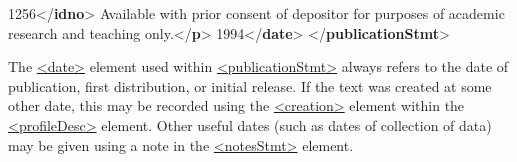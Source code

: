 \begin{shaded}
1256{</\textbf{idno}>}\mbox{}\newline 
{}\mbox{}\newline 
\hspace*{1em}Available with prior consent of depositor for\mbox{}\newline 
\hspace*{1em}\hspace*{1em}\hspace*{1em}\hspace*{1em} purposes of academic research and teaching only.{</\textbf{p}>}\mbox{}\newline 
{}\mbox{}\newline 
{}1994{</\textbf{date}>}\mbox{}\newline 
{</\textbf{publicationStmt}>}\end{shaded}\egroup\par \par
The \hyperref[TEI.date]{<date>} element used within \hyperref[TEI.publicationStmt]{<publicationStmt>} always refers to the date of publication, first distribution, or initial release. If the text was created at some other date, this may be recorded using the \hyperref[TEI.creation]{<creation>} element within the \hyperref[TEI.profileDesc]{<profileDesc>} element. Other useful dates (such as dates of collection of data) may be given using a note in the \hyperref[TEI.notesStmt]{<notesStmt>} element.\par
